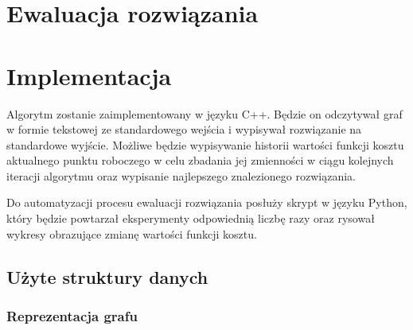 \documentclass[12pt,a4paper]{article}
\begin{document}
\section{Ewaluacja rozwiązania}

\section{Implementacja}
Algorytm zostanie zaimplementowany w języku C++. Będzie on odczytywał graf w formie tekstowej ze standardowego wejścia i wypisywał rozwiązanie na standardowe wyjście. Możliwe będzie wypisywanie historii wartości funkcji kosztu aktualnego punktu roboczego w celu zbadania jej zmienności w ciągu kolejnych iteracji algorytmu oraz wypisanie najlepszego znalezionego rozwiązania.

Do automatyzacji procesu ewaluacji rozwiązania posłuży skrypt w języku Python, który będzie powtarzał eksperymenty odpowiednią liczbę razy oraz rysował wykresy obrazujące zmianę wartości funkcji kosztu.

\subsection{Użyte struktury danych}
\subsubsection{Reprezentacja grafu}



\nocite{*}

\end{document}
